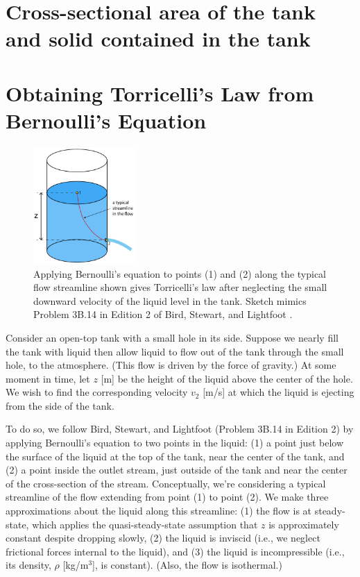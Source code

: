 \documentclass[a4paper,fleqn]{cas-sc}
\begin{document}
\section{Cross-sectional area of the tank and solid contained in the tank}




\section{Obtaining Torricelli's Law from Bernoulli's Equation}

\begin{figure}
	\centering
	\includegraphics[width=0.35\textwidth]{../drawings_and_photos/torricelli_illustration.pdf}
	\caption{Applying Bernoulli's equation to points (1) and (2) along the typical flow streamline shown gives Torricelli's law after neglecting the small downward velocity of the liquid level in the tank. Sketch mimics Problem 3B.14 in Edition 2 of Bird, Stewart, and Lightfoot \cite{bsl_book}.}
\end{figure}

	Consider an open-top tank with a small hole in its side. Suppose we nearly fill the tank with liquid then allow liquid to flow out of the tank through the small hole, to the atmosphere. (This flow is driven by the force of gravity.)
	At some moment in time, let $z$ [m] be the height of the liquid above the center of the hole. 
	We wish to find the corresponding velocity $v_2$ [m/s] at which the liquid is ejecting from the side of the tank. 
	
	To do so, we follow Bird, Stewart, and Lightfoot \cite{bsl_book} (Problem 3B.14 in Edition 2) by applying Bernoulli's equation to two points in the liquid: 
	(1) a point just below the surface of the liquid at the top of the tank, near the center of the tank, and 
	(2) a point inside the outlet stream, just outside of the tank and near the center of the cross-section of the stream. 
	 Conceptually, we're considering a typical streamline of the flow extending from point (1) to point (2).
	We make three approximations about the liquid along this streamline: 
	(1) the flow is at steady-state, which applies the quasi-steady-state assumption that $z$ is approximately constant despite dropping slowly,
	(2) the liquid is inviscid (i.e., we neglect frictional forces internal to the liquid),
	and
	(3) the liquid is incompressible (i.e., its density, $\rho$ [kg/m$^3$], is constant).
	(Also, the flow is isothermal.)
	
\end{document}
